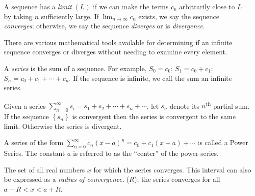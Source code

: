 \begin{definition}
A sequence has a \emph{limit} $(L)$ if we can make the terms $c_n$ arbitrarily close to $L$ by taking $n$ sufficiently large.  If $\lim_{n\to \infty} c_n$ exists, we say the sequence \emph{converges}; otherwise, we say the sequence \emph{diverges} or is \emph{divergence}.
\end{definition}

There are various mathematical tools available for determining if an infinite sequence converges or diverges without needing to examine every element.

\begin{definition}
A \emph{series} is the sum of a sequence. For example, $S_0 = c_0$; $S_1 = c_0+c_1$; $S_n = c_0+c_1+\cdots+c_n$.  If the sequence is infinite, we call the sum an infinite series.
\end{definition}

\begin{definition}
Given a series $\sum\limits_{n=0}^{\infty}s_i=s_1+s_2+\cdots+s_n+\cdots$, let $s_n$ denote its $n$\textsuperscript{th} partial sum.  If the sequence $\left\{s_n \right\}$ is convergent then the series is convergent to the same limit.  Otherwise the series is divergent.
\end{definition}

\begin{definition}
A series of the form $\sum\limits_{n=0}^{\infty}c_n(x-a)^n=c_0+c_1(x-a)+\cdots$ is called a Power Series. The constant $a$ is referred to as the ``center'' of the power series.
\end{definition}


\begin{definition}
The set of all real numbers $x$ for which the series converges.  This interval can also be expressed as a \emph{radius of convergence.} ($R$); the series converges for all $a-R < x < a+R$.
\end{definition}

